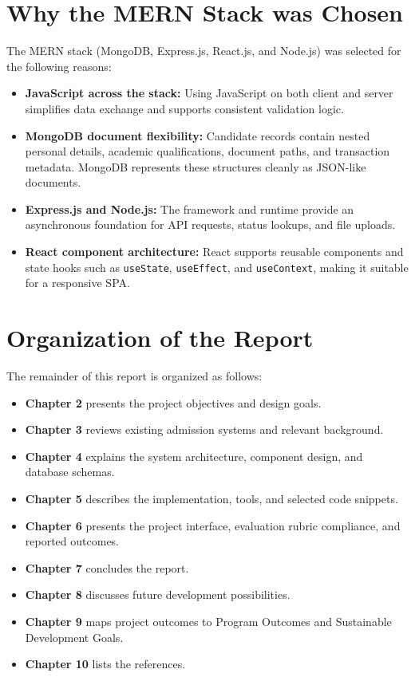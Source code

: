 \documentclass[12pt,a4paper,oneside]{report}
\begin{document}
\section{Why the MERN Stack was Chosen}
The MERN stack (MongoDB, Express.js, React.js, and Node.js) was selected for the following reasons:
\begin{itemize}
    \item \textbf{JavaScript across the stack:} Using JavaScript on both client and server simplifies data exchange and supports consistent validation logic.
    \item \textbf{MongoDB document flexibility:} Candidate records contain nested personal details, academic qualifications, document paths, and transaction metadata. MongoDB represents these structures cleanly as JSON-like documents.
    \item \textbf{Express.js and Node.js:} The framework and runtime provide an asynchronous foundation for API requests, status lookups, and file uploads.
    \item \textbf{React component architecture:} React supports reusable components and state hooks such as \texttt{useState}, \texttt{useEffect}, and \texttt{useContext}, making it suitable for a responsive SPA.
\end{itemize}

\section{Organization of the Report}
The remainder of this report is organized as follows:
\begin{itemize}
    \item \textbf{Chapter 2} presents the project objectives and design goals.
    \item \textbf{Chapter 3} reviews existing admission systems and relevant background.
    \item \textbf{Chapter 4} explains the system architecture, component design, and database schemas.
    \item \textbf{Chapter 5} describes the implementation, tools, and selected code snippets.
    \item \textbf{Chapter 6} presents the project interface, evaluation rubric compliance, and reported outcomes.
    \item \textbf{Chapter 7} concludes the report.
    \item \textbf{Chapter 8} discusses future development possibilities.
    \item \textbf{Chapter 9} maps project outcomes to Program Outcomes and Sustainable Development Goals.
    \item \textbf{Chapter 10} lists the references.
\end{itemize}
\end{document}
